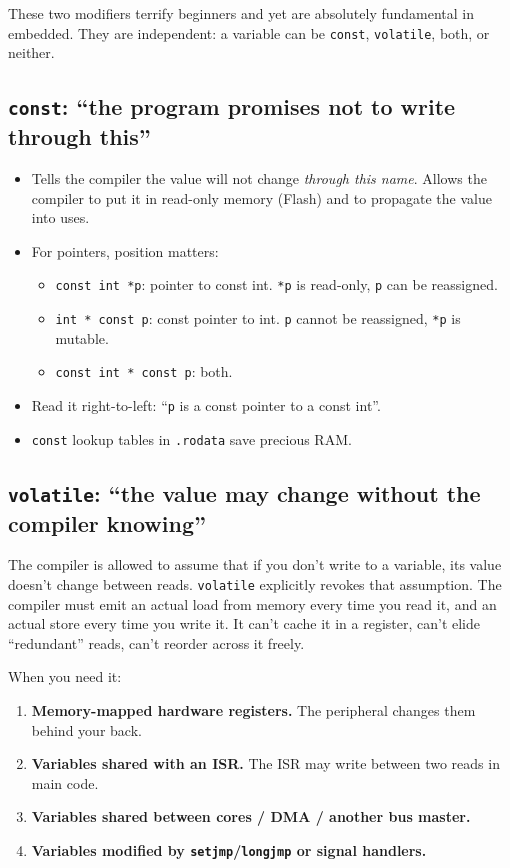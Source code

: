 \documentclass[11pt,a4paper]{article}
\begin{document}
These two modifiers terrify beginners and yet are absolutely fundamental
in embedded. They are independent: a variable can be \texttt{const},
\texttt{volatile}, both, or neither.

\subsection{\texttt{const}: ``the program promises not to write through this''}

\begin{itemize}[leftmargin=*]
    \item Tells the compiler the value will not change \emph{through this
    name}. Allows the compiler to put it in read-only memory (Flash) and to
    propagate the value into uses.
    \item For pointers, position matters:
        \begin{itemize}
            \item \texttt{const int *p}: pointer to const int. \texttt{*p}
            is read-only, \texttt{p} can be reassigned.
            \item \texttt{int * const p}: const pointer to int. \texttt{p}
            cannot be reassigned, \texttt{*p} is mutable.
            \item \texttt{const int * const p}: both.
        \end{itemize}
    \item Read it right-to-left: ``\texttt{p} is a const pointer to a const int''.
    \item \texttt{const} lookup tables in \texttt{.rodata} save precious RAM.
\end{itemize}

\subsection{\texttt{volatile}: ``the value may change without the compiler knowing''}

The compiler is allowed to assume that if you don't write to a variable,
its value doesn't change between reads. \texttt{volatile} explicitly
revokes that assumption. The compiler must emit an actual load from memory
every time you read it, and an actual store every time you write it. It
can't cache it in a register, can't elide ``redundant'' reads, can't reorder
across it freely.

When you need it:
\begin{enumerate}[leftmargin=*]
    \item \textbf{Memory-mapped hardware registers.} The peripheral changes
    them behind your back.
    \item \textbf{Variables shared with an ISR.} The ISR may write between
    two reads in main code.
    \item \textbf{Variables shared between cores / DMA / another bus master.}
    \item \textbf{Variables modified by \texttt{setjmp}/\texttt{longjmp}
    or signal handlers.}
\end{enumerate}
\end{document}
